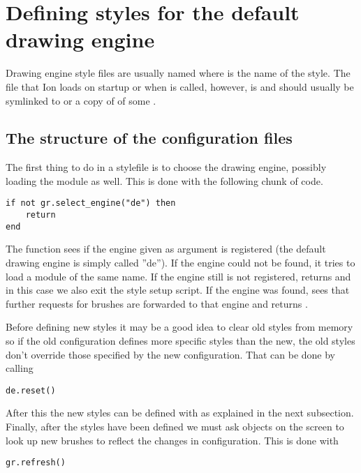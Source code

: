 \section{Defining styles for the default drawing engine}
\label{sec:defaultde}

Drawing engine style files are usually named
 where  is the name of the
style. The file that Ion loads on startup or when
 is called, however, is 
and should usually be symlinked to or a copy of of some
.

\subsection{The structure of the configuration files}

The first thing to do in a stylefile is to choose the drawing
engine, possibly loading the module as well. This is done
with the following chunk of code.

\begin{verbatim}
if not gr.select_engine("de") then 
    return 
end
\end{verbatim}

The  function sees if the engine
given as argument is registered (the default drawing engine is
simply called ''de''). If the engine could not be found, it
tries to load a module of the same name. If the engine still
is not registered,  returns 
and in this case we also exit the style setup script.
If the engine was found,  sees that
further requests for brushes are forwarded to that engine
and returns .

Before defining new styles it may be a good idea to clear old
styles from memory so if the old configuration defines more
specific styles than the new, the old styles don't override 
those specified by the new configuration. That can be done by
calling

\begin{verbatim}
de.reset()
\end{verbatim}

After this the new styles can be defined with 
as explained in the next subsection. Finally, after the styles have
been defined we must ask objects on the screen to look up new brushes
to reflect the changes in configuration. This is done with

\begin{verbatim}
gr.refresh()
\end{verbatim}

